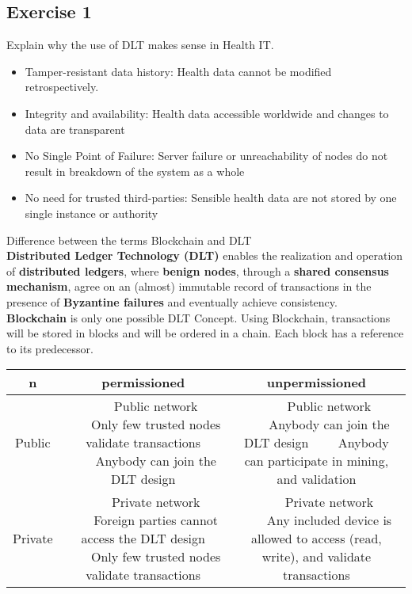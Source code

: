 \documentclass{article}
\newcommand{\tabitem}{~~\llap{\textbullet}~~}
\begin{document}
\subsection{Exercise 1}
Explain why the use of DLT makes sense in Health IT.
\begin{itemize}
    \item Tamper-resistant data history: Health data cannot be modified retrospectively.
    \item Integrity and availability: Health data accessible worldwide and changes to data are transparent
    \item No Single Point of Failure: Server failure or unreachability of nodes do not result in breakdown of the system as a whole
    \item No need for trusted third-parties: Sensible health data are not stored by one single instance or authority
\end{itemize}
Difference between the terms Blockchain and DLT\\
\textbf{Distributed Ledger Technology (DLT)} enables the realization and operation of \textbf{distributed ledgers}, where \textbf{benign nodes}, through a \textbf{shared consensus mechanism}, agree on an (almost) immutable record of transactions in the presence of \textbf{Byzantine failures} and eventually achieve consistency.\\
\newline
\textbf{Blockchain} is only one possible DLT Concept. Using Blockchain, transactions will be stored in blocks and will be ordered in a chain. Each block has a reference to its predecessor.\\
\begin{adjustbox}{width=1.5\textwidth,center=\textwidth}
    \begin{tabular}{|c|c|c|}
        \hline
        n       & permissioned             & unpermissioned \\
        \hline
        Public  & \tabitem Public network
        \tabitem Only few trusted nodes validate transactions 
        \tabitem Anybody can join the DLT design
                & \tabitem Public network
        \tabitem Anybody can join the DLT design
        \tabitem Anybody can participate in mining, and validation
        \\
        \hline
        Private & \tabitem Private network
        \tabitem Foreign parties cannot access the DLT design
        \tabitem Only few trusted nodes validate transactions
                &
        \tabitem Private network
        \tabitem Any included device is allowed to access (read, write), and validate transactions
        \\
        \hline
    \end{tabular}
\end{adjustbox}
\end{document}
